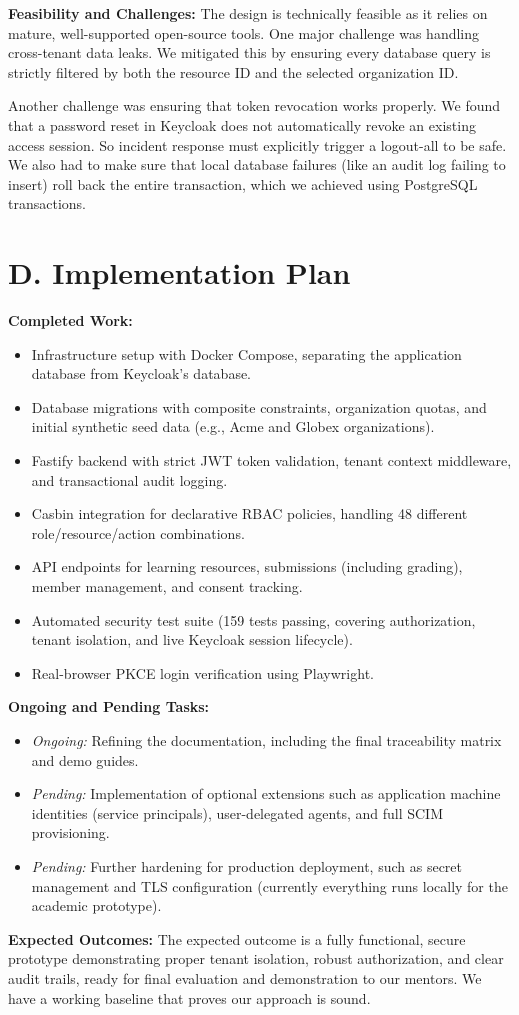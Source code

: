 \documentclass{article}
\begin{document}
\textbf{Feasibility and Challenges:} The design is technically feasible as it relies on mature, well-supported open-source tools. One major challenge was handling cross-tenant data leaks. We mitigated this by ensuring every database query is strictly filtered by both the resource ID and the selected organization ID. 

Another challenge was ensuring that token revocation works properly. We found that a password reset in Keycloak does not automatically revoke an existing access session. So incident response must explicitly trigger a logout-all to be safe. We also had to make sure that local database failures (like an audit log failing to insert) roll back the entire transaction, which we achieved using PostgreSQL transactions.

\section*{D. Implementation Plan}
\textbf{Completed Work:}
\begin{itemize}
    \item Infrastructure setup with Docker Compose, separating the application database from Keycloak's database.
    \item Database migrations with composite constraints, organization quotas, and initial synthetic seed data (e.g., Acme and Globex organizations).
    \item Fastify backend with strict JWT token validation, tenant context middleware, and transactional audit logging.
    \item Casbin integration for declarative RBAC policies, handling 48 different role/resource/action combinations.
    \item API endpoints for learning resources, submissions (including grading), member management, and consent tracking.
    \item Automated security test suite (159 tests passing, covering authorization, tenant isolation, and live Keycloak session lifecycle).
    \item Real-browser PKCE login verification using Playwright.
\end{itemize}

\textbf{Ongoing and Pending Tasks:}
\begin{itemize}
    \item \textit{Ongoing:} Refining the documentation, including the final traceability matrix and demo guides.
    \item \textit{Pending:} Implementation of optional extensions such as application machine identities (service principals), user-delegated agents, and full SCIM provisioning.
    \item \textit{Pending:} Further hardening for production deployment, such as secret management and TLS configuration (currently everything runs locally for the academic prototype).
\end{itemize}

\textbf{Expected Outcomes:} The expected outcome is a fully functional, secure prototype demonstrating proper tenant isolation, robust authorization, and clear audit trails, ready for final evaluation and demonstration to our mentors. We have a working baseline that proves our approach is sound.
\end{document}
